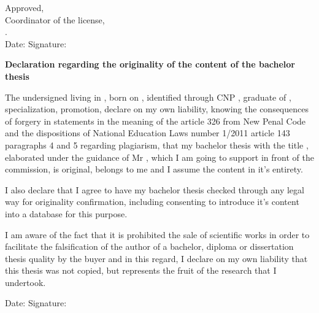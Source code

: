 \vspace*{\fill}

\begin{flushright}
    Approved, \\
    Coordinator of the license, \\
    \coordinator. \\
    Date: \dottedline \hspace{1cm} Signature: \dottedline
\end{flushright}

\vspace{1cm}
\begin{center}
    \large
    \textbf{Declaration regarding the originality of the content of the bachelor thesis}
\end{center}

The undersigned \textbf{\authornamelf} living in \textbf{\authoraddress}, born on \textbf{\authorbirth}, identified through CNP \textbf{\authorcnp}, graduate of \facultyg, \textbf{\faculty} \textbf{\speciality} specialization, \promotion \space promotion, declare on my own liability, knowing the consequences of forgery in statements in the meaning of the article 326 from New Penal Code and the dispositions of National Education Laws number 1/2011 article 143 paragraphs 4 and 5 regarding plagiarism, that my bachelor thesis with the title \textbf{\thesistitle}, elaborated under the guidance of Mr \textbf{\coordinator}, which I am going to support in front of the commission, is original, belongs to me and I assume the content in it's entirety.

I also declare that I agree to have my bachelor thesis checked through any legal way for originality confirmation, including consenting to introduce it's content into a database for this purpose.

I am aware of the fact that it is prohibited the sale of scientific works in order to facilitate the falsification of the author of a bachelor, diploma or dissertation thesis quality by the buyer and in this regard, I declare on my own liability that this thesis was not copied, but represents the fruit of the research that I undertook.

\begin{flushright}
    Date: \dottedline \hspace{6cm} Signature: \dottedline
\end{flushright}

\vspace*{\fill}
\pagebreak